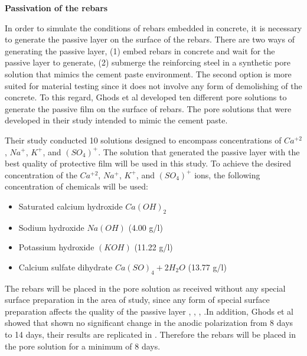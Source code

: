 \newpage

\textbf{Passivation of the rebars}

In order to simulate the conditions of rebars embedded in concrete, it is necessary to generate the passive layer on the surface of the rebars. There are two ways of generating the passive layer, (1) embed rebars in concrete and wait for the passive layer to generate, (2) submerge the reinforcing steel in a synthetic pore solution that mimics the cement paste environment. The second option is more suited for material testing since it does not involve any form of demolishing of the concrete. To this regard, Ghods et al \cite{Ghods2010} developed ten different pore solutions to generate the passive film on the surface of rebars. The pore solutions that were developed in their study intended to mimic the cement paste. 

Their study conducted 10 solutions designed to encompass concentrations of $Ca^{+2}$, $Na^{+}$, $K^{+}$, and $(SO_{4})^{+}$. The solution that generated the passive layer with the best quality of protective film will be used in this study. To achieve the desired concentration of the $Ca^{+2}$, $Na^{+}$, $K^{+}$, and $(SO_{4})^{+}$ ions, the following concentration of chemicals will be used:

\begin{itemize}
	\item Saturated calcium hydroxide $Ca(OH)_2$
	\item Sodium hydroxide $Na(OH)$ (4.00 g/l)
	\item Potassium hydroxide $(KOH)$ (11.22 g/l)
	\item Calcium sulfate dihydrate $Ca(SO)_4 + 2H_2O$ (13.77 g/l)
\end{itemize}

The rebars will be placed in the pore solution as received without any special surface preparation in the area of study, since any form of special surface preparation affects the quality of the passive layer \cite{Andersson1989}, \cite{DawnMarcotte2001}, \cite{Moragues1987}, \cite{Page1983}.In addition, Ghods et al showed that  shown no significant change in the anodic polarization from 8 days to 14 days, their results are replicated in . Therefore the rebars will be placed in the pore solution for a minimum of 8 days. 

